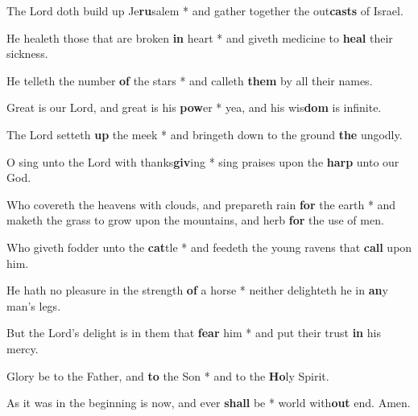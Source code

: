 \begin{multicols}{2}
	The Lord doth build up Je\textbf{ru}salem * and gather together the out\textbf{casts} of Israel.
	
	He healeth those that are broken \textbf{in} heart * and giveth medicine to \textbf{heal} their sickness.
	
	He telleth the number \textbf{of} the stars * and calleth \textbf{them} by all their names.
	
	Great is our Lord, and great is his \textbf{pow}er * yea, and his wis\textbf{dom} is infinite.
	
	The Lord setteth \textbf{up} the meek * and bringeth down to the ground \textbf{the} ungodly.
	
	O sing unto the Lord with thanks\textbf{giv}ing * sing praises upon the \textbf{harp} unto our God.
	
	Who covereth the heavens with clouds, and prepareth rain \textbf{for} the earth * and maketh the grass to grow upon the mountains, and herb \textbf{for} the use of men.
	
	Who giveth fodder unto the \textbf{cat}tle * and feedeth the young ravens that \textbf{call} upon him.
	
	He hath no pleasure in the strength \textbf{of} a horse * neither delighteth he in \textbf{an}y man's legs.
	
	But the Lord's delight is in them that \textbf{fear} him * and put their trust \textbf{in} his mercy.
	
	Glory be to the Father, and \textbf{to} the Son * and to the \textbf{Ho}ly Spirit.
	
	As it was in the beginning is now, and ever \textbf{shall} be * world with\textbf{out} end. Amen.
\end{multicols}